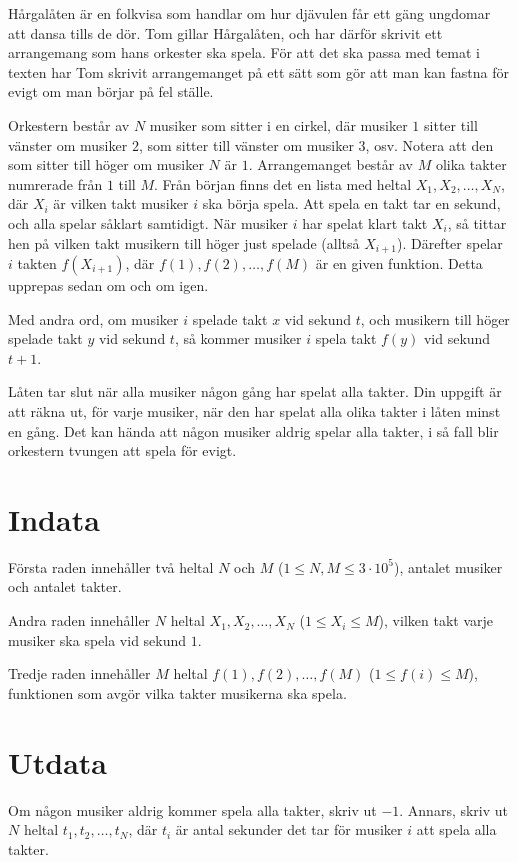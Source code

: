 \noindent

Hårgalåten är en folkvisa som handlar om hur djävulen får ett gäng ungdomar att dansa
tills de dör. Tom gillar Hårgalåten, och har därför skrivit ett arrangemang som hans
orkester ska spela. För att det ska passa med temat i texten har Tom skrivit 
arrangemanget på ett sätt som gör att man kan fastna för evigt om man börjar på fel ställe.

Orkestern består av $N$ musiker som sitter i en cirkel, där musiker $1$ sitter till vänster om 
musiker $2$, som sitter till vänster om musiker $3$, osv. Notera att den som sitter 
till höger om musiker $N$ är $1$. Arrangemanget består av $M$ olika takter numrerade från $1$ till $M$. 
Från början finns det en lista med heltal $X_1, X_2, \dots, X_N$,
där $X_i$ är vilken takt musiker $i$ ska börja spela. Att spela en takt tar en sekund, och alla
spelar såklart samtidigt. När musiker $i$ har spelat klart takt $X_i$, så tittar hen på vilken 
takt musikern till höger just spelade (alltså $X_{i+1}$). Därefter spelar $i$ takten $f(X_{i+1})$,
där $f(1), f(2), \dots, f(M)$ är en given funktion. Detta upprepas sedan om och om igen.

Med andra ord, om musiker $i$ spelade takt $x$ vid sekund $t$, och musikern till höger spelade takt
$y$ vid sekund $t$, så kommer musiker $i$ spela takt $f(y)$ vid sekund $t+1$. 

Låten tar slut när alla musiker någon gång har spelat alla takter. Din uppgift är att räkna 
ut, för varje musiker, när den har spelat alla olika takter i låten minst en gång. Det kan hända 
att någon musiker aldrig spelar alla takter, i så fall blir orkestern tvungen att spela för evigt.

\section*{Indata}
Första raden innehåller två heltal $N$ och $M$ ($1 \leq N,M \leq 3 \cdot 10^5$), antalet 
musiker och antalet takter.

Andra raden innehåller $N$ heltal $X_1, X_2, \dots, X_N$ ($1 \leq X_i \leq M$), vilken takt varje musiker ska 
spela vid sekund $1$.

Tredje raden innehåller $M$ heltal $f(1), f(2), \dots, f(M)$ ($1 \leq f(i) \leq M$), funktionen som 
avgör vilka takter musikerna ska spela.

\section*{Utdata}
Om någon musiker aldrig kommer spela alla takter, skriv ut $-1$.
Annars, skriv ut $N$ heltal $t_1, t_2, \dots, t_N$, där $t_i$ är antal sekunder det tar för musiker $i$ att spela alla takter.

